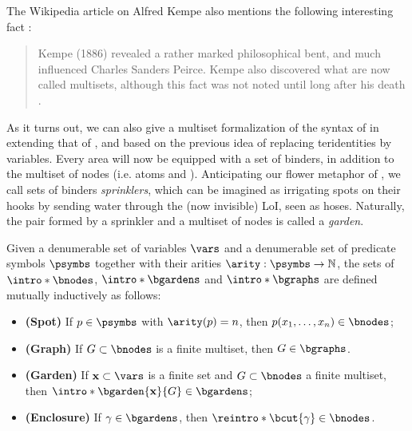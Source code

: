 \begin{scope}
The Wikipedia article on Alfred Kempe also mentions the following interesting
fact \cite{noauthor_alfred_2023}:
\begin{quote}
  Kempe (1886) revealed a rather marked philosophical bent, and much influenced
Charles Sanders Peirce. Kempe also discovered what are now called multisets,
although this fact was not noted until long after his death
.
\end{quote}
As it turns out, we can also give a multiset formalization of the syntax of
 in  extending that of , and based on the
previous idea of replacing teridentities by variables. Every area will now be
equipped with a set of binders, in addition to the multiset of nodes (i.e. atoms
and ). Anticipating our flower metaphor of , we call
sets of binders \emph{sprinklers}, which can be imagined as irrigating spots on
their hooks by sending water through the (now invisible) LoI, seen as hoses.
Naturally, the pair formed by a sprinkler and a multiset of nodes is called a
\emph{garden}.

\begin{definition}[Graph] 
  
  Given a denumerable set of variables $\vars$ and a denumerable set of
  predicate symbols $\psymbs$ together with their arities $\arity : \psymbs \to
  \nats$, the sets of  $\intro*\bnodes$, 
  $\intro*\bgardens$ and  $\intro*\bgraphs$ are defined mutually
  inductively as follows:
  \begin{itemize}
    \item \textbf{(Spot)} If $p \in \psymbs$ with $\arity(p) = n$, then $p(x_1,
    \ldots, x_n) \in \bnodes$;
    \item \textbf{(Graph)} If $G \subset \bnodes$ is a finite multiset, then $G
    \in \bgraphs$.
    \item \textbf{(Garden)} If $\bx \subset \vars$ is a finite set and $G
    \subset \bnodes$ a finite multiset, then $\intro*\bgarden{\bx}{G} \in
    \bgardens$;
    \item \textbf{(Enclosure)} If $\gamma \in \bgardens$, then
    $\reintro*\bcut{\gamma} \in \bnodes$.
  \end{itemize}
\end{definition}


\end{scope}
